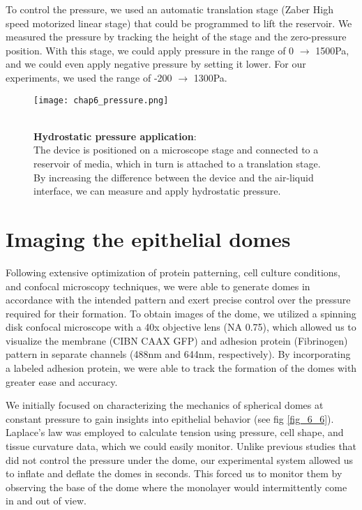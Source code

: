 To control the pressure, we used an automatic translation stage (Zaber High speed motorized linear stage) that could be programmed to lift the reservoir. We measured the pressure by tracking the height of the stage and the zero-pressure position. With this stage, we could apply pressure in the range of 0 $\rightarrow$ 1500\unit{\pascal}, and we could even apply negative pressure by setting it lower. For our experiments, we used the range of -200 $\rightarrow$ 1300\unit{\pascal}.

\begin{figure}
	\begin{minipage}[c]{0.6\textwidth}
		\texttt{[image: chap6\_pressure.png]}
	\end{minipage}\hfill
	\begin{minipage}[c]{0.35\textwidth}
		\caption{\\ \textbf{Hydrostatic pressure application}:\\ The device is positioned on a microscope stage and connected to a reservoir of media, which in turn is attached to a translation stage. By increasing the difference between the device and the air-liquid interface, we can measure and apply hydrostatic pressure.
		} \label{fig_6_3}
	\end{minipage}
\end{figure}


\hypertarget{imaging-the-epithelial-domes}{%
\section{Imaging the epithelial
domes}\label{imaging-the-epithelial-domes}}

Following extensive optimization of protein patterning, cell culture conditions, and confocal microscopy techniques, we were able to generate domes in accordance with the intended pattern and exert precise control over the pressure required for their formation. To obtain images of the dome, we utilized a spinning disk confocal microscope with a 40x objective lens (NA 0.75), which allowed us to visualize the membrane (CIBN CAAX GFP) and adhesion protein (Fibrinogen) pattern in separate channels (488\unit{\nm} and 644\unit{\nm}, respectively). By incorporating a labeled adhesion protein, we were able to track the formation of the domes with greater ease and accuracy.

We initially focused on characterizing the mechanics of spherical domes at constant pressure to gain insights into epithelial behavior (see fig \ref{fig_6_6}). Laplace's law was employed to calculate tension using pressure, cell shape, and tissue curvature data, which we could easily monitor. Unlike previous studies that did not control the pressure under the dome, our experimental system allowed us to inflate and deflate the domes in seconds. This forced us to monitor them by observing the base of the dome where the monolayer would intermittently come in and out of view.

